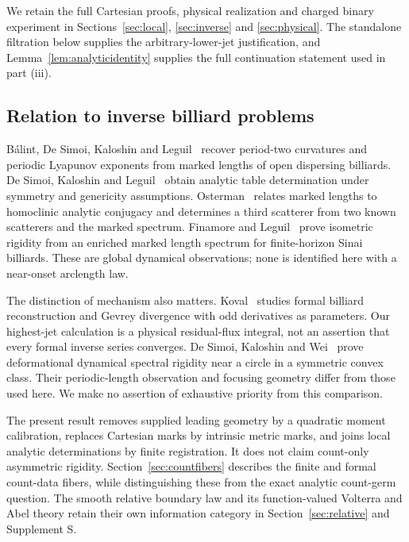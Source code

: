 We retain the full Cartesian proofs, physical realization and charged
binary experiment in Sections~\ref{sec:local}, \ref{sec:inverse} and
\ref{sec:physical}. The standalone filtration below supplies the
arbitrary-lower-jet justification, and Lemma~\ref{lem:analyticidentity}
supplies the full continuation statement used in part (iii).

\subsection{Relation to inverse billiard problems}
B\'alint, De Simoi, Kaloshin and Leguil~\cite{BDKL} recover period-two
curvatures and periodic Lyapunov exponents from marked lengths of open
dispersing billiards. De Simoi, Kaloshin and Leguil~\cite{DSKL} obtain
analytic table determination under symmetry and genericity assumptions.
Osterman~\cite{Osterman} relates marked lengths to homoclinic analytic
conjugacy and determines a third scatterer from two known scatterers and
the marked spectrum. Finamore and Leguil~\cite{FL} prove isometric
rigidity from an enriched marked length spectrum for finite-horizon
Sinai billiards. These are global dynamical observations; none is
identified here with a near-onset arclength law.

The distinction of mechanism also matters. Koval~\cite{Koval} studies
formal billiard reconstruction and Gevrey divergence with odd derivatives
as parameters. Our highest-jet calculation is a physical residual-flux
integral, not an assertion that every formal inverse series converges.
De Simoi, Kaloshin and Wei~\cite{DSKW} prove deformational dynamical
spectral rigidity near a circle in a symmetric convex class. Their
periodic-length observation and focusing geometry differ from those
used here. We make no assertion of exhaustive priority from this
comparison.

The present result removes supplied leading geometry by a quadratic
moment calibration, replaces Cartesian marks by intrinsic metric marks,
and joins local analytic determinations by finite registration. It does
not claim count-only asymmetric rigidity. Section~\ref{sec:countfibers}
describes the finite and formal count-data fibers, while distinguishing
these from the exact analytic count-germ question. The smooth relative
boundary law and its function-valued Volterra and Abel theory retain their
own information category in Section~\ref{sec:relative} and Supplement S.
